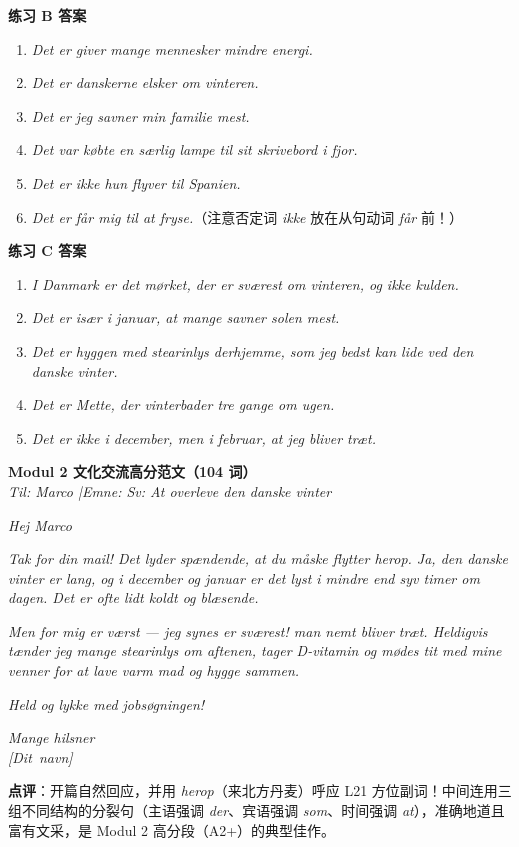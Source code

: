 \begin{answerbox}
\textbf{练习 B 答案}
\begin{enumerate}
  \item \textit{Det er  giver mange mennesker mindre energi.}
  \item \textit{Det er  danskerne elsker om vinteren.}
  \item \textit{Det er  jeg savner min familie mest.}
  \item \textit{Det var  købte en særlig lampe til sit skrivebord i fjor.}
  \item \textit{Det er ikke  hun flyver til Spanien.}
  \item \textit{Det er  får mig til at fryse.}（注意否定词 \textit{ikke} 放在从句动词 \textit{får} 前！）
\end{enumerate}

\textbf{练习 C 答案}
\begin{enumerate}
  \item \textit{I Danmark er det mørket, der er sværest om vinteren, og ikke kulden.}
  \item \textit{Det er især i januar, at mange savner solen mest.}
  \item \textit{Det er hyggen med stearinlys derhjemme, som jeg bedst kan lide ved den danske vinter.}
  \item \textit{Det er Mette, der vinterbader tre gange om ugen.}
  \item \textit{Det er ikke i december, men i februar, at jeg bliver træt.}
\end{enumerate}

\textbf{Modul 2 文化交流高分范文（104 词）}\\
\textit{Til: Marco \quad|\quad Emne: Sv: At overleve den danske vinter}

\textit{Hej Marco}

\textit{Tak for din mail! Det lyder spændende, at du måske flytter herop. Ja, den danske vinter er lang, og i december og januar er det lyst i mindre end syv timer om dagen. Det er ofte lidt koldt og blæsende.}

\textit{Men for mig  er værst ---  jeg synes er sværest!  man nemt bliver træt. Heldigvis tænder jeg mange stearinlys om aftenen, tager D-vitamin og mødes tit med mine venner for at lave varm mad og hygge sammen.}

\textit{Held og lykke med jobsøgningen!}

\textit{Mange hilsner\\
\mbox{[Dit navn]}}

\small\textbf{点评}：开篇自然回应，并用 \textit{herop}（来北方丹麦）呼应 L21 方位副词！中间连用三组不同结构的分裂句（主语强调 \textit{der}、宾语强调 \textit{som}、时间强调 \textit{at}），准确地道且富有文采，是 Modul 2 高分段（A2+）的典型佳作。
\end{answerbox}
